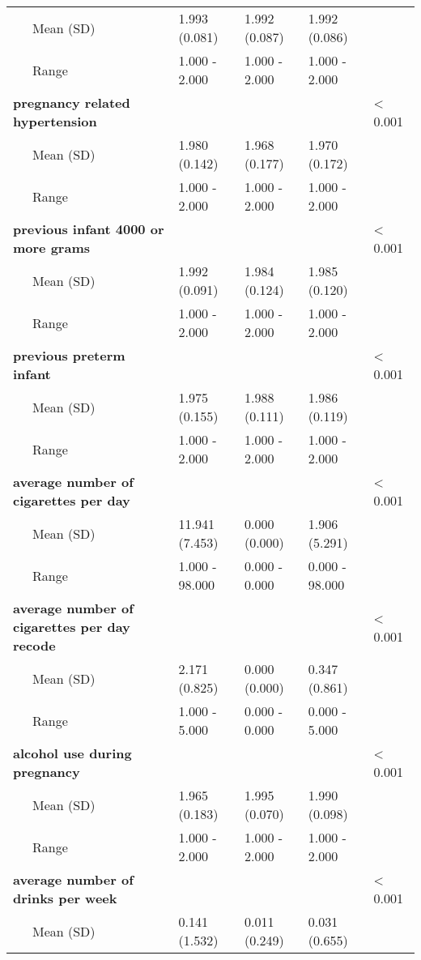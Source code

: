 \begin{longtable}[c]{@{}lllll@{}}
\\\addlinespace
~~~Mean (SD) & 1.993 (0.081) & 1.992 (0.087) & 1.992 (0.086) &
\\\addlinespace
~~~Range & 1.000 - 2.000 & 1.000 - 2.000 & 1.000 - 2.000 &
\\\addlinespace
\textbf{pregnancy related hypertension} & & & & \textless{} 0.001
\\\addlinespace
~~~Mean (SD) & 1.980 (0.142) & 1.968 (0.177) & 1.970 (0.172) &
\\\addlinespace
~~~Range & 1.000 - 2.000 & 1.000 - 2.000 & 1.000 - 2.000 &
\\\addlinespace
\textbf{previous infant 4000 or more grams} & & & & \textless{} 0.001
\\\addlinespace
~~~Mean (SD) & 1.992 (0.091) & 1.984 (0.124) & 1.985 (0.120) &
\\\addlinespace
~~~Range & 1.000 - 2.000 & 1.000 - 2.000 & 1.000 - 2.000 &
\\\addlinespace
\textbf{previous preterm infant} & & & & \textless{} 0.001
\\\addlinespace
~~~Mean (SD) & 1.975 (0.155) & 1.988 (0.111) & 1.986 (0.119) &
\\\addlinespace
~~~Range & 1.000 - 2.000 & 1.000 - 2.000 & 1.000 - 2.000 &
\\\addlinespace
\textbf{average number of cigarettes per day} & & & & \textless{} 0.001
\\\addlinespace
~~~Mean (SD) & 11.941 (7.453) & 0.000 (0.000) & 1.906 (5.291) &
\\\addlinespace
~~~Range & 1.000 - 98.000 & 0.000 - 0.000 & 0.000 - 98.000 &
\\\addlinespace
\textbf{average number of cigarettes per day recode} & & & & \textless{}
0.001
\\\addlinespace
~~~Mean (SD) & 2.171 (0.825) & 0.000 (0.000) & 0.347 (0.861) &
\\\addlinespace
~~~Range & 1.000 - 5.000 & 0.000 - 0.000 & 0.000 - 5.000 &
\\\addlinespace
\textbf{alcohol use during pregnancy} & & & & \textless{} 0.001
\\\addlinespace
~~~Mean (SD) & 1.965 (0.183) & 1.995 (0.070) & 1.990 (0.098) &
\\\addlinespace
~~~Range & 1.000 - 2.000 & 1.000 - 2.000 & 1.000 - 2.000 &
\\\addlinespace
\textbf{average number of drinks per week} & & & & \textless{} 0.001
\\\addlinespace
~~~Mean (SD) & 0.141 (1.532) & 0.011 (0.249) & 0.031 (0.655) &

\end{longtable}
